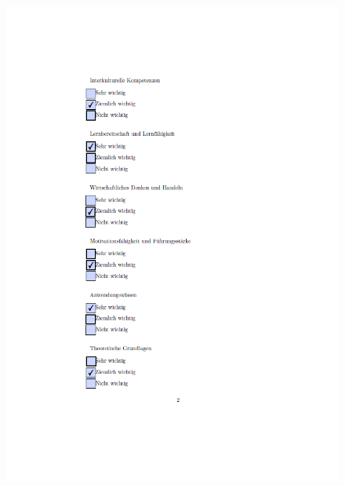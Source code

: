 \begin{figure}[ht]
 	\centering
	\includegraphics[width=1.3\textwidth]{images/Sandro2.png}
 	\label{fig:fragsan2}
\end{figure}

